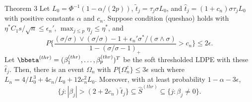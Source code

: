 \begin{frame}
\begin{block} {Theorem 3}
\scriptsize
    Let $L_0=\Phi^{-1}(1-\alpha/(2p))$, $\tilde{t}_j = \tau_j\sigma L_0$, and
$\hat{t}_j = (1+{c}_n)\sigma\tau_j L_0$ with positive constants $\alpha$ and ${c}_n$. Suppose
condition (queshao) holds with $\eta^*C_1s/\sqrt{n}\leq \epsilon_n'$, $\max_{j\leq p}\eta_j\leq \eta^*$, and
\begin{equation}
P\Big\{\frac{(\sigma/\sigma)\vee(\sigma/\sigma) -1+\epsilon_n'\sigma^*/(\sigma\wedge \sigma)}
{1-(\sigma/\sigma-1)_+ } > {c}_n\Big\} \leq 2\epsilon.
\end{equation}
    Let $\bbeta^{(thr)} = (\beta_1^{(thr)},\ldots,\beta_p^{(thr)})^T$ be the {soft} thresholded LDPE
with these $\hat{t}_j$.
Then, there is an event $\Omega_n$ with $P\{\Omega_n^c\} \leq 3 \epsilon$ such %
where $L_n = 4/L_0^3+4{c}_n/L_0+12{c}_n^2L_0$.
Moreover, with at least probability $1-\alpha - 3\epsilon$,
\begin{equation}
\{j: |\beta_j|> (2+2{c}_n)\tilde{t}_j\} \subseteq \hat{S}^{(thr)} \subseteq \{j:\beta_j\neq 0\}.
\end{equation}
\end{block}
\end{frame}

